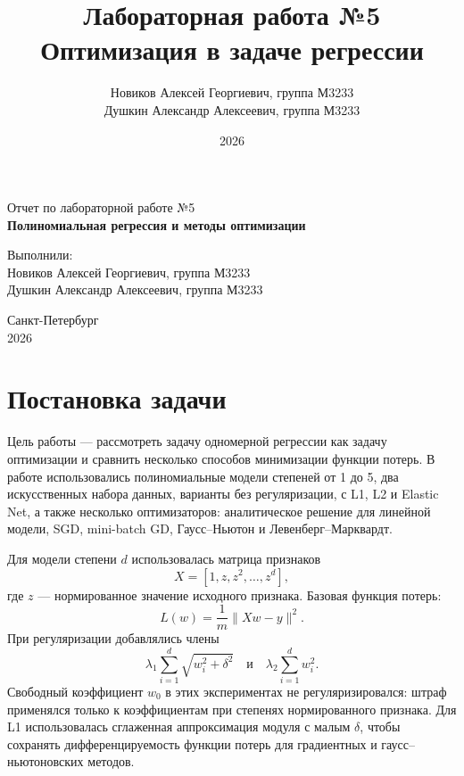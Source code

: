 \documentclass[14pt,a4paper]{extarticle}
\title{Лабораторная работа №5\\Оптимизация в задаче регрессии}
\author{
    Новиков Алексей Георгиевич, группа М3233\\
    Душкин Александр Алексеевич, группа М3233
}
\date{2026}
\begin{document}
\hypersetup{pageanchor=false}
\begin{titlepage}
    \begin{center}
        {\large Отчет по лабораторной работе №5}\\[0.5cm]
        {\LARGE \textbf{Полиномиальная регрессия и методы оптимизации}}\\[2cm]

        \begin{flushright}
            Выполнили:\\[0.2cm]
            Новиков Алексей Георгиевич, группа М3233\\
            Душкин Александр Алексеевич, группа М3233\\[0.5cm]
        \end{flushright}

        \vfill
        Санкт-Петербург\\[0.2cm]
        2026
    \end{center}
\end{titlepage}
\hypersetup{pageanchor=true}

\tableofcontents
\newpage

\section{Постановка задачи}

Цель работы --- рассмотреть задачу одномерной регрессии как задачу оптимизации и сравнить несколько способов минимизации функции потерь. В работе использовались полиномиальные модели степеней от 1 до 5, два искусственных набора данных, варианты без регуляризации, с L1, L2 и Elastic Net, а также несколько оптимизаторов: аналитическое решение для линейной модели, SGD, mini-batch GD, Гаусс--Ньютон и Левенберг--Марквардт.

Для модели степени $d$ использовалась матрица признаков
\[
    X = [1,z,z^2,\ldots,z^d],
\]
где $z$ --- нормированное значение исходного признака. Базовая функция потерь:
\[
    L(w)=\frac1m\|Xw-y\|^2.
\]
При регуляризации добавлялись члены
\[
    \lambda_1\sum_{i=1}^{d} \sqrt{w_i^2+\delta^2}
    \quad\text{и}\quad
    \lambda_2\sum_{i=1}^{d} w_i^2.
\]
Свободный коэффициент $w_0$ в этих экспериментах не регуляризировался: штраф применялся только к коэффициентам при степенях нормированного признака. Для L1 использовалась сглаженная аппроксимация модуля с малым $\delta$, чтобы сохранять дифференцируемость функции потерь для градиентных и гаусс--ньютоновских методов.
\end{document}

